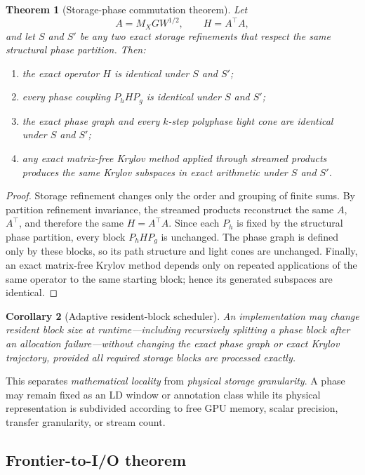 \documentclass[11pt]{article}
\newtheorem{theorem}{Theorem}[section]
\newtheorem{corollary}[theorem]{Corollary}
\theoremstyle{definition}
\theoremstyle{remark}
\begin{document}
\begin{theorem}[Storage-phase commutation theorem]
Let
\[
A=M_XGW^{1/2},
\qquad H=A^\top A,
\]
and let $S$ and $S'$ be any two exact storage refinements that respect the
same structural phase partition.  Then:
\begin{enumerate}[label=(\roman*)]
\item the exact operator $H$ is identical under $S$ and $S'$;
\item every phase coupling $P_hHP_g$ is identical under $S$ and $S'$;
\item the exact phase graph and every $k$-step polyphase light cone are
identical under $S$ and $S'$;
\item any exact matrix-free Krylov method applied through streamed products
produces the same Krylov subspaces in exact arithmetic under $S$ and $S'$.
\end{enumerate}
\end{theorem}

\begin{proof}
Storage refinement changes only the order and grouping of finite sums.
By partition refinement invariance, the streamed products reconstruct the
same $A$, $A^\top$, and therefore the same $H=A^\top A$.  Since each
$P_h$ is fixed by the structural phase partition, every block
$P_hHP_g$ is unchanged.  The phase graph is defined only by these blocks, so
its path structure and light cones are unchanged.  Finally, an exact
matrix-free Krylov method depends only on repeated applications of the same
operator to the same starting block; hence its generated subspaces are
identical.
\end{proof}

\begin{corollary}[Adaptive resident-block scheduler]
An implementation may change resident block size at runtime---including
recursively splitting a phase block after an allocation failure---without
changing the exact phase graph or exact Krylov trajectory, provided all
required storage blocks are processed exactly.
\end{corollary}

This separates \emph{mathematical locality} from \emph{physical storage
granularity}.  A phase may remain fixed as an LD window or annotation class
while its physical representation is subdivided according to free GPU
memory, scalar precision, transfer granularity, or stream count.

\subsection{Frontier-to-I/O theorem}
\end{document}
